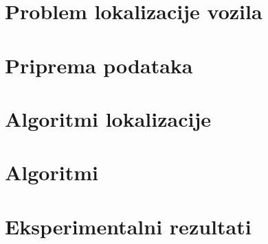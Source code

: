 \documentclass[times, utf8, diplomski]{fer}
\begin{document}
\tableofcontents

\chapter{Problem lokalizacije vozila}

\chapter{Priprema podataka}

\chapter{Algoritmi lokalizacije}

\chapter{Algoritmi}

\chapter{Eksperimentalni rezultati}



\end{document}
